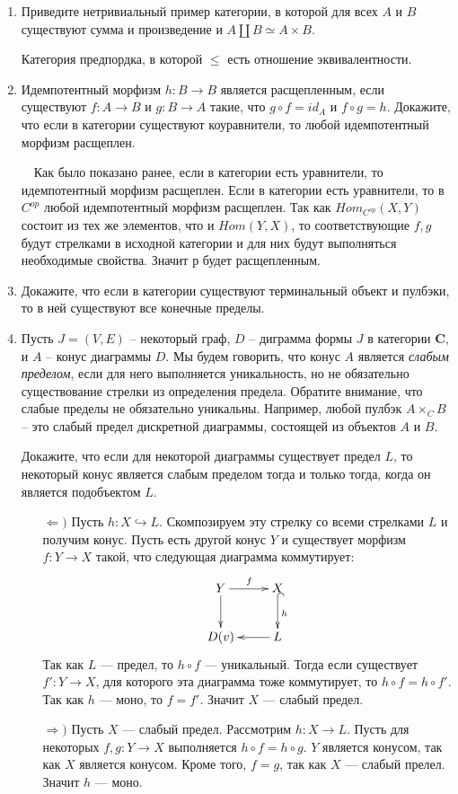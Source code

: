 \documentclass[draft]{article}
\newcommand{\cat}[1]{\mathbf{#1}}
\renewcommand{\C}{\cat{C}}
\begin{document}
\begin{enumerate}
\item Приведите нетривиальный пример категории, в которой для всех $A$ и $B$ существуют сумма и произведение и $A \amalg B \simeq A \times B$.

Категория предпордка, в которой $\leq$ есть отношение эквивалентности.

\item Идемпотентный морфизм $h : B \to B$ является расщепленным, если существуют $f : A \to B$ и $g : B \to A$ такие, что $g \circ f = id_A$ и $f \circ g = h$.
Докажите, что если в категории существуют коуравнители, то любой идемпотентный морфизм расщеплен.

~~Как было показано ранее, если в категории есть уравнители, то идемпотентный морфизм расщеплен. Если в категории есть уравнители, то в 
$C^{op}$ любой идемпотентный морфизм расщеплен. Так как $Hom_{C^{op}}(X, Y)$ состоит из тех же элементов, что и $Hom(Y, X)$, то соответствующие $f, g$ будут стрелками в исходной категории и для них будут выполняться необходимые свойства. Значит $р$ будет расщепленным.

\item Докажите, что если в категории существуют терминальный объект и пулбэки, то в ней существуют все конечные пределы.


\item Пусть $J = (V,E)$ -- некоторый граф, $D$ -- диграмма формы $J$ в категории $\C$, и $A$ -- конус диаграммы $D$.
Мы будем говорить, что конус $A$ является \emph{слабым пределом}, если для него выполняется уникальность, но не обязательно существование стрелки из определения предела.
Обратите внимание, что слабые пределы не обязательно уникальны.
Например, любой пулбэк $A \times_C B$ -- это слабый предел дискретной диаграммы, состоящей из объектов $A$ и $B$.

Докажите, что если для некоторой диаграммы существует предел $L$, то некоторый конус является слабым пределом тогда и только тогда, когда он является подобъектом $L$.

\begin{itemize}
\item[$\Leftarrow)$] Пусть $h: X \hookrightarrow L$. Скомпозируем эту стрелку со всеми стрелками $L$ и получим конус. Пусть есть другой конус $Y$ и существует морфизм $f: Y \to X$ такой, что следующая диаграмма коммутирует:
\[ \xymatrix{ 
Y \ar[r]^f \ar[d] & X \ar@{^{(}->}[d]^h \\
D(v)& L \ar[l]
} \]
Так как $L$ --- предел, то $h\circ f$ --- уникальный. Тогда если существует $f' : Y \to X$, для которого эта диаграмма тоже коммутирует, то  $h\circ f = h \circ f'$. Так как $h$ --- моно, то $f=f'$. Значит $X$ --- слабый предел.

\item[$\Rightarrow)$] Пусть $X$ --- слабый предел. Рассмотрим $h: X \to L$. Пусть для некоторых $f, g : Y \to X$ выполняется $h \circ f = h \circ g$. $Y$ является конусом, так как $X$ является конусом. Кроме того, $f = g$, так как $X$ --- слабый прелел. Значит $h$ --- моно.

\end{itemize}

\end{enumerate}
\end{document}
